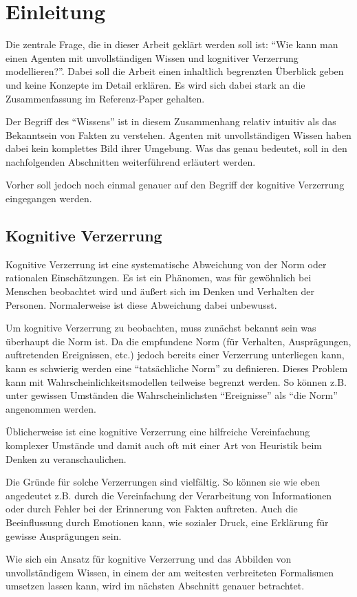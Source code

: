 \chapter{Einleitung}
\label{introduction}
Die zentrale Frage, die in dieser Arbeit geklärt werden soll ist: \enquote{Wie kann man einen Agenten mit unvollständigen Wissen und kognitiver Verzerrung modellieren?}. 
Dabei soll die Arbeit einen inhaltlich begrenzten Überblick geben und keine Konzepte im Detail erklären. Es wird sich dabei stark an die Zusammenfassung im Referenz-Paper \cite{balke2014agents} gehalten.

Der Begriff des \enquote{Wissens} ist in diesem Zusammenhang relativ intuitiv als das Bekanntsein von Fakten zu verstehen.
Agenten mit unvollständigen Wissen haben dabei kein komplettes Bild ihrer Umgebung.
Was das genau bedeutet, soll in den nachfolgenden Abschnitten weiterführend erläutert werden.

Vorher soll jedoch noch einmal genauer auf den Begriff der kognitive Verzerrung eingegangen werden.

\section{Kognitive Verzerrung}
Kognitive Verzerrung ist eine systematische Abweichung von der Norm oder rationalen Einschätzungen\cite{haselton2015evolution}. 
Es ist ein Phänomen, was für gewöhnlich bei Menschen beobachtet wird und äußert sich im Denken und Verhalten der Personen.
Normalerweise ist diese Abweichung dabei unbewusst.

Um kognitive Verzerrung zu beobachten, muss zunächst bekannt sein was überhaupt die Norm ist.
Da die empfundene Norm (für Verhalten, Ausprägungen, auftretenden Ereignissen, etc.) jedoch bereits einer Verzerrung unterliegen kann, kann es schwierig werden eine \enquote{tatsächliche Norm} zu definieren. 
Dieses Problem kann mit Wahrscheinlichkeitsmodellen teilweise begrenzt werden. 
So können z.B. unter gewissen Umständen die Wahrscheinlichsten \enquote{Ereignisse} als \enquote{die Norm} angenommen werden.

Üblicherweise ist eine kognitive Verzerrung eine hilfreiche Vereinfachung komplexer Umstände und damit auch oft mit einer Art von Heuristik beim Denken zu veranschaulichen\cite{tversky1974judgment}.

Die Gründe für solche Verzerrungen sind vielfältig.
So können sie wie eben angedeutet z.B. durch die Vereinfachung der Verarbeitung von Informationen oder durch Fehler bei der Erinnerung von Fakten auftreten.
Auch die Beeinflussung durch Emotionen kann, wie sozialer Druck, eine Erklärung für gewisse Ausprägungen sein.

Wie sich ein Ansatz für kognitive Verzerrung und das Abbilden von unvollständigem Wissen, in einem der am weitesten verbreiteten Formalismen umsetzen lassen kann, wird im nächsten Abschnitt genauer betrachtet.